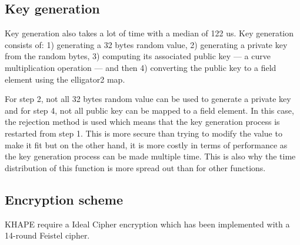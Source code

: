 ﻿\documentclass[../report.tex]{subfiles}
\begin{document}
\pgfplotsset{width=\textwidth-2.4cm}
\pgfplotsset{height=4cm}


\subsection{Key generation}
Key generation also takes a lot of time with a median of 122 us. Key generation consists of: 1) generating a 32 bytes random value, 2) generating a private key from the random bytes, 3) computing its associated public key --- a curve multiplication operation --- and then 4) converting the public key to a field element using the elligator2 map.

For step 2, not all 32 bytes random value can be used to generate a private key and for step 4, not all public key can be mapped to a field element.
In this case, the rejection method is used which means that the key generation process is restarted from step 1. This is more secure than trying to modify the value to make it fit but on the other hand, it is more costly in terms of performance as the key generation process can be made multiple time.
This is also why the time distribution of this function is more spread out than for other functions.


\pgfplotsset{width=\textwidth-0.3cm}
\pgfplotsset{height=4cm}


\subsection{Encryption scheme}
KHAPE require a Ideal Cipher encryption which has been implemented with a 14-round Feistel cipher.
\end{document}
